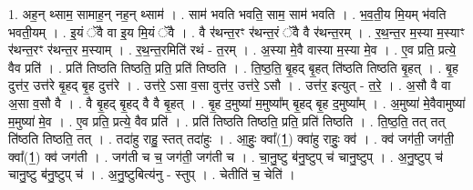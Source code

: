 \documentclass[17pt]{extarticle}
\begin{document}
1. अह॒न् थ्साम॒ सामाह॒न् नह॒न् थ्साम॑ । . साम॑ भवति भवति॒ साम॒ साम॑ भवति । . भ॒व॒ती॒य मि॒यम् भ॑वति भवती॒यम् । . इ॒यं ॅवै वा इ॒य मि॒यं ॅवै । . वै र॑थन्त॒रꣳ र॑थन्त॒रं ॅवै वै र॑थन्त॒रम् । . र॒थ॒न्त॒र म॒स्या म॒स्याꣳ र॑थन्त॒रꣳ र॑थन्त॒र म॒स्याम् । . र॒थ॒न्त॒रमिति॑ रथं - त॒रम् । . अ॒स्या मे॒वै वास्या म॒स्या मे॒व । . ए॒व प्रति॒ प्रत्ये॒ वैव प्रति॑ । . प्रति॑ तिष्ठति तिष्ठति॒ प्रति॒ प्रति॑ तिष्ठति । . ति॒ष्ठ॒ति॒ बृ॒हद् बृ॒हत् ति॑ष्ठति तिष्ठति बृ॒हत् । . बृ॒ह दुत्त॑र॒ उत्त॑रे बृ॒हद् बृ॒ह दुत्त॑रे । . उत्त॑रे॒ ऽसा व॒सा वुत्त॑र॒ उत्त॑रे॒ ऽसौ । . उत्त॑र॒ इत्युत् - त॒रे॒ । . अ॒सौ वै वा अ॒सा व॒सौ वै । . वै बृ॒हद् बृ॒हद् वै वै बृ॒हत् । . बृ॒ह द॒मुष्या॑ म॒मुष्या᳚म् बृ॒हद् बृ॒ह द॒मुष्या᳚म् । . अ॒मुष्या॑ मे॒वैवामुष्या॑ म॒मुष्या॑ मे॒व । . ए॒व प्रति॒ प्रत्ये॒ वैव प्रति॑ । . प्रति॑ तिष्ठति तिष्ठति॒ प्रति॒ प्रति॑ तिष्ठति । . ति॒ष्ठ॒ति॒ तत् तत् ति॑ष्ठति तिष्ठति॒ तत् । . तदा॑हु राहु॒ स्तत् तदा॑हुः । . आ॒हुः॒ क्वा᳚(1॒) क्वा॑हु राहुः॒ क्व॑ । . क्व॑ जग॑ती॒ जग॑ती॒ क्वा᳚(1॒) क्व॑ जग॑ती । . जग॑ती च च॒ जग॑ती॒ जग॑ती च । . चा॒नु॒ष्टु ब॑नु॒ष्टुप् च॑ चानु॒ष्टुप् । . अ॒नु॒ष्टुप् च॑ चानु॒ष्टु ब॑नु॒ष्टुप् च॑ । . अ॒नु॒ष्टुबित्य॑नु - स्तुप् । . चेतीति॑ च॒ चेति॑ । \newline
\end{document}
